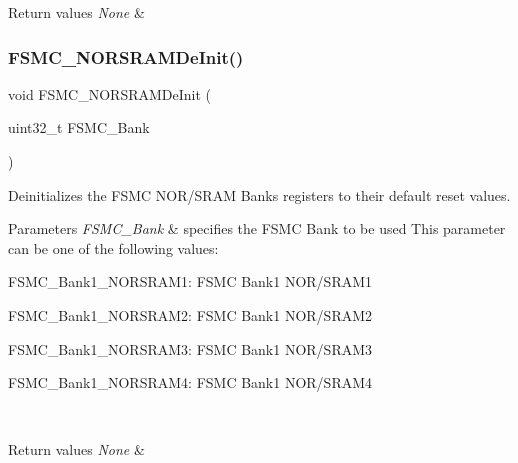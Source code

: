 \begin{DoxyRetVals}{Return values}
{\em None} & \\
\hline
\end{DoxyRetVals}
\mbox{\label{group___f_s_m_c___exported___functions_gaab3e6648e8a584e73785361ac960eded}} 
\subsubsection{\texorpdfstring{FSMC\_NORSRAMDeInit()}{FSMC\_NORSRAMDeInit()}}
{\footnotesize\ttfamily void F\+S\+M\+C\+\_\+\+N\+O\+R\+S\+R\+A\+M\+De\+Init (\begin{DoxyParamCaption}\item[{uint32\+\_\+t}]{F\+S\+M\+C\+\_\+\+Bank }\end{DoxyParamCaption})}



Deinitializes the F\+S\+MC N\+O\+R/\+S\+R\+AM Banks registers to their default reset values. 


\begin{DoxyParams}{Parameters}
{\em F\+S\+M\+C\+\_\+\+Bank} & specifies the F\+S\+MC Bank to be used This parameter can be one of the following values\+: \begin{DoxyItemize}
\item F\+S\+M\+C\+\_\+\+Bank1\+\_\+\+N\+O\+R\+S\+R\+A\+M1\+: F\+S\+MC Bank1 N\+O\+R/\+S\+R\+A\+M1\end{DoxyItemize}
\begin{DoxyItemize}
\item F\+S\+M\+C\+\_\+\+Bank1\+\_\+\+N\+O\+R\+S\+R\+A\+M2\+: F\+S\+MC Bank1 N\+O\+R/\+S\+R\+A\+M2 \item F\+S\+M\+C\+\_\+\+Bank1\+\_\+\+N\+O\+R\+S\+R\+A\+M3\+: F\+S\+MC Bank1 N\+O\+R/\+S\+R\+A\+M3 \item F\+S\+M\+C\+\_\+\+Bank1\+\_\+\+N\+O\+R\+S\+R\+A\+M4\+: F\+S\+MC Bank1 N\+O\+R/\+S\+R\+A\+M4 \end{DoxyItemize}
\\
\hline
\end{DoxyParams}

\begin{DoxyRetVals}{Return values}
{\em None} & \\
\hline
\end{DoxyRetVals}
\mbox{\label{group___f_s_m_c___exported___functions_ga9c27816e8b17394c9ee1ce9298917b4a}} 
